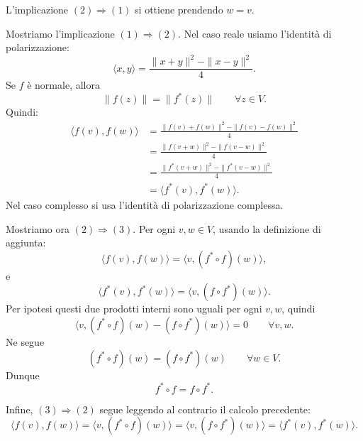 \documentclass[a4paper]{article}
\begin{document}
\begin{snippetproof}{}
    L'implicazione \((2)\Rightarrow(1)\) si ottiene prendendo \(w=v\).

    Mostriamo l'implicazione \((1)\Rightarrow(2)\). Nel caso reale usiamo l'identità di polarizzazione:
    \[
        \langle x,y\rangle
        =
        \frac{\|x+y\|^2-\|x-y\|^2}{4}.
    \]
    Se \(f\) è normale, allora
    \[
        \|f(z)\|=\|f^*(z)\|
        \qquad
        \forall z\in V.
    \]
    Quindi:
    \begin{align*}
        \langle f(v),f(w)\rangle
        &=
        \frac{\|f(v)+f(w)\|^2-\|f(v)-f(w)\|^2}{4}\\
        &=
        \frac{\|f(v+w)\|^2-\|f(v-w)\|^2}{4}\\
        &=
        \frac{\|f^*(v+w)\|^2-\|f^*(v-w)\|^2}{4}\\
        &=
        \langle f^*(v),f^*(w)\rangle.
    \end{align*}
    Nel caso complesso si usa l'identità di polarizzazione complessa.

    Mostriamo ora \((2)\Rightarrow(3)\). Per ogni \(v,w\in V\), usando la definizione di aggiunta:
    \[
        \langle f(v),f(w)\rangle
        =
        \langle v,(f^*\circ f)(w)\rangle,
    \]
    e
    \[
        \langle f^*(v),f^*(w)\rangle
        =
        \langle v,(f\circ f^*)(w)\rangle.
    \]
    Per ipotesi questi due prodotti interni sono uguali per ogni \(v,w\), quindi
    \[
        \langle v,(f^*\circ f)(w)-(f\circ f^*)(w)\rangle=0
        \qquad
        \forall v,w.
    \]
    Ne segue
    \[
        (f^*\circ f)(w)=(f\circ f^*)(w)
        \qquad
        \forall w\in V.
    \]
    Dunque
    \[
        f^*\circ f=f\circ f^*.
    \]

    Infine, \((3)\Rightarrow(2)\) segue leggendo al contrario il calcolo precedente:
    \[
        \langle f(v),f(w)\rangle
        =
        \langle v,(f^*\circ f)(w)\rangle
        =
        \langle v,(f\circ f^*)(w)\rangle
        =
        \langle f^*(v),f^*(w)\rangle.
    \]
\end{snippetproof}
\end{document}
